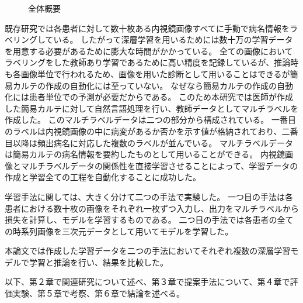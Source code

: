 \begin{figure}[htbp]
    \centering
         \quad
         \quad
    \captionsetup{format=plain,font=normalsize,margin=30pt,name=図}
    \caption[]{全体概要}
    \label{fig:overview}
\end{figure}

既存研究では各患者に対して数十枚ある内視鏡画像すべてに手動で病名情報をラベリングしている。
したがって深層学習を用いるためには数十万の学習データを用意する必要があるために膨大な時間がかかっている。
全ての画像においてラベリングをした教師あり学習であるために高い精度を記録しているが、推論時も各画像単位で行われるため、画像を用いた診断として用いることはできるが簡易カルテの作成の自動化には至っていない。
なぜなら簡易カルテの作成の自動化には患者単位での予測が必要だからである。
このため本研究では医師が作成した簡易カルテに対して自然言語処理を行い、教師データとしてマルチラベルを作成した。
このマルチラベルデータは二つの部分から構成されている。
一番目のラベルは内視鏡画像の中に病変があるか否かを示す値が格納されており、二番目以降は頻出病名に対応した複数のラベルが並んでいる。
マルチラベルデータは簡易カルテの病名情報を要約したものとして用いることができる。
内視鏡画像とマルチラベルデータの関係性を直接学習させることによって、学習データの作成と学習全ての工程を自動化することに成功した。

学習手法に関しては、大きく分けて二つの手法で実験した。
一つ目の手法は各患者における数十枚の画像をそれぞれ一枚ずつ入力し、出力をマルチラベルから損失を計算し、モデルを学習するものである。
二つ目の手法では各患者の全ての時系列画像を三次元データとして用いてモデルを学習した。

本論文では作成した学習データを二つの手法においてそれぞれ複数の深層学習モデルで学習と推論を行い、結果を比較した。

以下、第２章で関連研究について述べ、第３章で提案手法について、第４章で評価実験、第５章で考察、第６章で結論を述べる。
